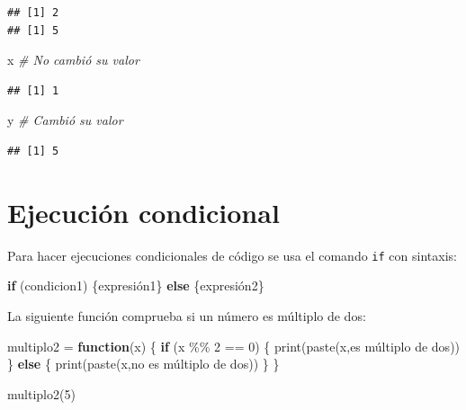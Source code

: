 \documentclass[
]{book}
\newenvironment{Shaded}{\begin{snugshade}}{\end{snugshade}}
\newcommand{\CommentTok}[1]{\textcolor[rgb]{0.56,0.35,0.01}{\textit{#1}}}
\newcommand{\ControlFlowTok}[1]{\textcolor[rgb]{0.13,0.29,0.53}{\textbf{#1}}}
\newcommand{\DecValTok}[1]{\textcolor[rgb]{0.00,0.00,0.81}{#1}}
\newcommand{\FunctionTok}[1]{\textcolor[rgb]{0.00,0.00,0.00}{#1}}
\newcommand{\NormalTok}[1]{#1}
\newcommand{\OtherTok}[1]{\textcolor[rgb]{0.56,0.35,0.01}{#1}}
\newcommand{\SpecialCharTok}[1]{\textcolor[rgb]{0.00,0.00,0.00}{#1}}
\newcommand{\StringTok}[1]{\textcolor[rgb]{0.31,0.60,0.02}{#1}}
\theoremstyle{break}
\begin{document}
\begin{verbatim}
## [1] 2
## [1] 5
\end{verbatim}

\begin{Shaded}
\begin{Highlighting}[]
\NormalTok{x }\CommentTok{\# No cambió su valor}
\end{Highlighting}
\end{Shaded}

\begin{verbatim}
## [1] 1
\end{verbatim}

\begin{Shaded}
\begin{Highlighting}[]
\NormalTok{y }\CommentTok{\# Cambió su valor}
\end{Highlighting}
\end{Shaded}

\begin{verbatim}
## [1] 5
\end{verbatim}

\hypertarget{ejecuciuxf3n-condicional}{%
\section{Ejecución condicional}\label{ejecuciuxf3n-condicional}}

Para hacer ejecuciones
condicionales de código se usa el comando \texttt{if} con sintaxis:

\begin{Shaded}
\begin{Highlighting}[]
\ControlFlowTok{if}\NormalTok{ (condicion1) \{expresión1\} }\ControlFlowTok{else}\NormalTok{ \{expresión2\}}
\end{Highlighting}
\end{Shaded}

La siguiente función comprueba si un número es múltiplo de dos:

\begin{Shaded}
\begin{Highlighting}[]
\NormalTok{multiplo2 }\OtherTok{=} \ControlFlowTok{function}\NormalTok{(x) \{}
  \ControlFlowTok{if}\NormalTok{ (x }\SpecialCharTok{\%\%} \DecValTok{2} \SpecialCharTok{==} \DecValTok{0}\NormalTok{) \{}
    \FunctionTok{print}\NormalTok{(}\FunctionTok{paste}\NormalTok{(x,}\StringTok{\textquotesingle{}es múltiplo de dos\textquotesingle{}}\NormalTok{))}
\NormalTok{  \} }\ControlFlowTok{else}\NormalTok{ \{}
    \FunctionTok{print}\NormalTok{(}\FunctionTok{paste}\NormalTok{(x,}\StringTok{\textquotesingle{}no es múltiplo de dos\textquotesingle{}}\NormalTok{))}
\NormalTok{  \}}
\NormalTok{\}}
  
\FunctionTok{multiplo2}\NormalTok{(}\DecValTok{5}\NormalTok{)}
\end{Highlighting}
\end{Shaded}
\end{document}
